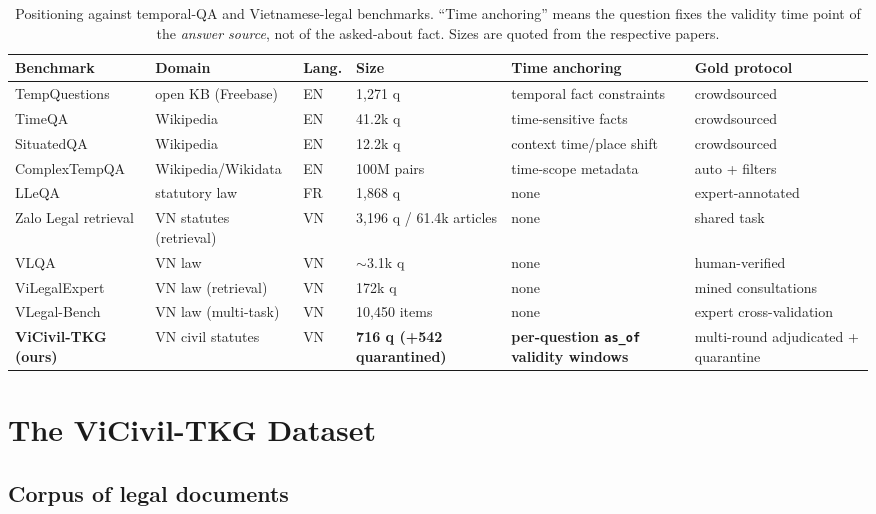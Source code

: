 \documentclass[10pt,a4paper,twocolumn]{article}
\newcommand{\code}[1]{\texttt{#1}}
\begin{document}
\begin{table}[t]
\centering\scriptsize
\caption{Positioning against temporal-QA and Vietnamese-legal benchmarks. ``Time anchoring'' means the question fixes the validity time point of the \emph{answer source}, not of the asked-about fact. Sizes are quoted from the respective papers.}
\label{tab:related}
\setlength{\tabcolsep}{3.2pt}
\begin{tabular}{llllll}
\toprule
Benchmark & Domain & Lang. & Size & Time anchoring & Gold protocol \\
\midrule
TempQuestions \cite{jia2018tempquestions} & open KB (Freebase) & EN & 1{,}271 q & temporal fact constraints & crowdsourced \\
TimeQA \cite{chen2021timeqa} & Wikipedia & EN & 41.2k q & time-sensitive facts & crowdsourced \\
SituatedQA \cite{zhang2021situatedqa} & Wikipedia & EN & 12.2k q & context time/place shift & crowdsourced \\
ComplexTempQA \cite{gruber2025complextempqa} & Wikipedia/Wikidata & EN & 100M pairs & time-scope metadata & auto + filters \\
LLeQA \cite{louis2024lleqa} & statutory law & FR & 1{,}868 q & none & expert-annotated \\
Zalo Legal retrieval \cite{zalolegal2019} & VN statutes (retrieval) & VN & 3{,}196 q / 61.4k articles & none & shared task \\
VLQA \cite{vu2025vlqa} & VN law & VN & $\sim$3.1k q & none & human-verified \\
ViLegalExpert \cite{vilegalexpert2026} & VN law (retrieval) & VN & 172k q & none & mined consultations \\
VLegal-Bench \cite{vlegalbench2025} & VN law (multi-task) & VN & 10{,}450 items & none & expert cross-validation \\
\midrule
\textbf{ViCivil-TKG (ours)} & VN civil statutes & VN & \textbf{716 q (+542 quarantined)} & \textbf{per-question \code{as\_of} validity windows} & multi-round adjudicated + quarantine \\
\bottomrule
\end{tabular}
\end{table}

\section{The ViCivil-TKG Dataset}

\subsection{Corpus of legal documents}
\end{document}
